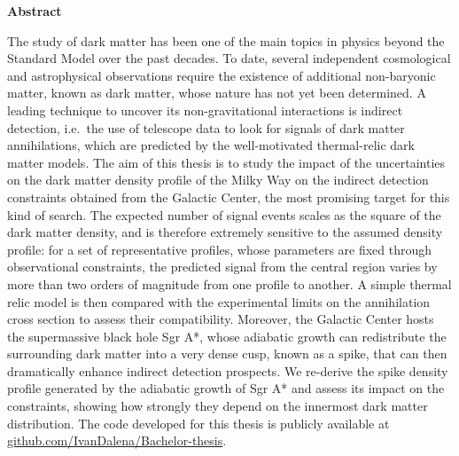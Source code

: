 \vfil\null
\cleardoublepage



\thispagestyle{empty}
\null\vfil

\begin{center}
  \bfseries Abstract
\end{center}

\vspace{1cm}

\noindent




The study of dark matter has been one of the main topics in physics beyond the Standard Model over the past decades.
To date, several independent cosmological and astrophysical observations require the existence of additional non-baryonic matter, known as dark matter, whose nature has not yet been determined.
A leading technique to uncover its non-gravitational interactions is indirect detection, i.e.\ the use of telescope data to look for signals of dark matter annihilations, 
which are predicted by the well-motivated thermal-relic dark matter models.
The aim of this thesis is to study the impact of the uncertainties on the dark matter density profile of the Milky Way on the indirect detection constraints obtained from the Galactic Center, the most promising target for this kind of search.
The expected number of signal events scales as the square of the dark matter density, and is therefore extremely sensitive to the assumed density profile: 
for a set of representative profiles, whose parameters are fixed through observational constraints, the predicted signal from the central region varies by more than two orders of magnitude from one profile to another.
A simple thermal relic model is then compared with the experimental limits on the annihilation cross section to assess their compatibility.
Moreover, the Galactic Center hosts the supermassive black hole Sgr A*, whose adiabatic growth can redistribute the surrounding dark matter into a very dense cusp, known as a spike, that can then dramatically enhance indirect detection prospects.
We re-derive the spike density profile generated by the adiabatic growth of Sgr A* and assess its impact on the constraints, showing how strongly they depend on the innermost dark matter distribution.
The code developed for this thesis is publicly available at \href{https://github.com/IvanDalena/Bachelor-thesis}{\textcolor{githublink}{github.com/IvanDalena/Bachelor-thesis}}.




\vfil\null



